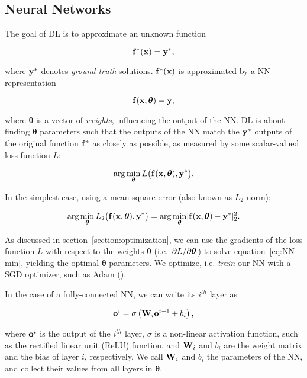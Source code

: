 \subsection{Neural Networks}
The goal of \acf{DL} is to approximate an unknown function 

$$\vb{f}^*(\vb{x}) = \vb{y}^*,$$

where $\vb{y}^*$ denotes \textit{ground truth} solutions. $\vb{f}^*(\vb{x})$ is
approximated by a \acf{NN} representation 

$$\vb{f}(\vb{x}, \boldsymbol\theta) = \vb{y},$$

where $\boldsymbol{\theta}$ is a vector of \textit{weights}, influencing the output of
the \ac{NN}. \ac{DL} is about finding $\boldsymbol{\theta}$ parameters such
that the outputs of the \ac{NN} match the $\vb{y}^*$ outputs of the original
function $\vb{f}^*$ as closely as possible, as measured by some scalar-valued
loss function $L$:

$$\arg\min_{\boldsymbol\theta} L\big(\vb{f}(\vb{x}, \boldsymbol\theta), \vb{y}^*
    \big).$$

In the simplest case, using a mean-square error (also known as $L_2$
norm):

\begin{equation}\label{eq:NN-min}
    \arg\min_{\boldsymbol\theta} 
        L_2\big(\vb{f}(\vb{x}, \boldsymbol\theta), \vb{y}^* \big) 
    = \arg\min_{\boldsymbol\theta} 
        \lvert \vb{f}(\vb{x}, \boldsymbol\theta) - \vb{y}^* \rvert_2^2.
\end{equation}

As discussed in section~\ref{section:optimization}, we can use the
gradients of the loss function $L$ with respect to the weights
$\boldsymbol{\theta}$ (i.e. $\pdv*{L}{\boldsymbol\theta}$) to solve
equation~\eqref{eq:NN-min}, yielding the optimal $\boldsymbol{\theta}$
parameters. We optimize, i.e. \textit{train} our \ac{NN} with a \acf{SGD}
optimizer, such as Adam (\cite{adam}).

In the case of a fully-connected \ac{NN}, we can write its $i^{th}$ layer as 

\begin{equation}
    \vb{o}^i = \sigma\left(\vb{W}_i \vb{o}^{i-1} + b_i\right),
\end{equation}

where $\vb{o}^i$ is the output of the $i^{th}$ layer, $\sigma$ is a non-linear
activation function, such as the rectified linear unit (ReLU) function, and
$\vb{W}_i$ and $b_i$ are the weight matrix and the bias of layer $i$,
respectively. We call $\vb{W}_i$ and $b_i$ the parameters of the \ac{NN},
and collect their values from all layers in $\boldsymbol\theta$.




